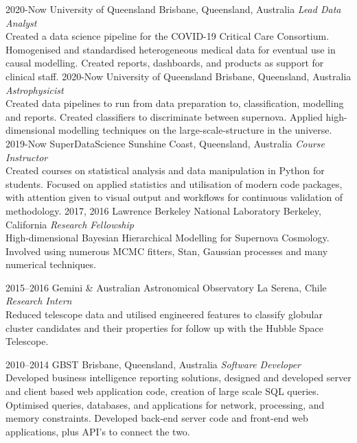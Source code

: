 \documentclass[]{friggeri-cv2}
\begin{document}
\begin{entrylist}
\entry
{2020-Now}
{University of Queensland}
{Brisbane, Queensland, Australia}
{\emph{Lead Data Analyst} \\
Created a data science pipeline for the COVID-19 Critical Care Consortium. Homogenised and standardised heterogeneous medical data for eventual use in causal modelling. Created reports, dashboards, and products as support for clinical staff.}
\entry
{2020-Now}
{University of Queensland}
{Brisbane, Queensland, Australia}
{\emph{Astrophysicist} \\
Created data pipelines to run from data preparation to, classification, modelling and reports. Created classifiers to discriminate between supernova. Applied high-dimensional modelling techniques on the large-scale-structure in the universe.}
\entry
{2019-Now}
{SuperDataScience}
{Sunshine Coast, Queensland, Australia}
{\emph{Course Instructor} \\
Created courses on statistical analysis and data manipulation in Python for students. Focused on applied statistics and utilisation of modern code packages, with attention given to visual output and workflows for continuous validation of methodology.}
\entry
{2017, 2016}
{Lawrence Berkeley National Laboratory}
{Berkeley, California}
{\emph{Research Fellowship} \\
High-dimensional Bayesian Hierarchical Modelling for Supernova Cosmology. Involved using numerous MCMC fitters, Stan, Gaussian processes and many numerical techniques.}


\entry
{2015--2016}
{Gemini \& Australian Astronomical Observatory}
{La Serena, Chile}
{\emph{Research Intern} \\
Reduced telescope data and utilised engineered features to classify globular cluster candidates and their properties for follow up with the Hubble Space Telescope.}

\entry
{2010--2014}
{GBST}
{Brisbane, Queensland, Australia}
{\emph{Software Developer} \\
Developed business intelligence reporting solutions, designed and developed server and client based web application code, creation of large scale SQL queries. Optimised queries, databases, and applications for network, processing, and memory constraints. Developed back-end server code and front-end web applications, plus API's to connect the two.}

\end{entrylist}

\end{document}
